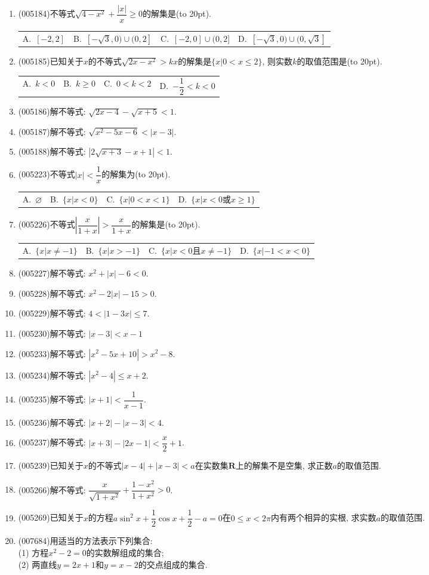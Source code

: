 \documentclass[10pt,a4paper]{article}
\newcommand{\bracket}[1]{(\hbox to #1pt{})}
\newcommand{\fourch}[4]{\par\begin{tabular}{p{.23\textwidth}p{.23\textwidth}p{.23\textwidth}p{.23\textwidth}}
A.~#1 &B.~#2& C.~#3& D.~#4
\end{tabular}}
\begin{document}
\begin{enumerate}[1.]
\item {\tiny (005184)}不等式$\sqrt{4-x^2}+\dfrac{|x|}x\ge 0$的解集是\bracket{20}.
\fourch{$[-2,2]$}{$[-\sqrt 3,0)\cup (0,2]$}{$[-2,0]\cup (0,2]$}{$[-\sqrt 3,0)\cup (0,\sqrt 3]$}
\item {\tiny (005185)}已知关于$x$的不等式$\sqrt{2x-x^2}>kx$的解集是$\{x|0<x\le 2\}$, 则实数$k$的取值范围是\bracket{20}.
\fourch{$k<0$}{$k\ge 0$}{$0<k<2$}{$-\dfrac 12<k<0$}
\item {\tiny (005186)}解不等式: $\sqrt{2x-4}-\sqrt{x+5}<1$.
\item {\tiny (005187)}解不等式: $\sqrt{x^2-5x-6}<|x-3|$.
\item {\tiny (005188)}解不等式: $|2\sqrt{x+3}-x+1|<1$.
\item {\tiny (005223)}不等式$|x|<\dfrac 1x$的解集为\bracket{20}.
\fourch{$\varnothing$}{$\{x|x<0\}$}{$\{x|0<x<1\}$}{$\{x|x<0\text{或}x\ge 1\}$}
\item {\tiny (005226)}不等式$|\dfrac x{1+x}|>\dfrac x{1+x}$的解集是\bracket{20}.
\fourch{$\{x|x\ne -1\}$}{$\{x|x>-1\}$}{$\{x|x<0\text{且}x\ne -1\}$}{$\{x|-1<x<0\}$}
\item {\tiny (005227)}解不等式: $x^2+|x|-6<0$.
\item {\tiny (005228)}解不等式: $x^2-2|x|-15>0$.
\item {\tiny (005229)}解不等式: $4<|1-3x|\le 7$.
\item {\tiny (005230)}解不等式: $|x-3|<x-1$
\item {\tiny (005233)}解不等式: $|x^2-5x+10|>x^2-8$.
\item {\tiny (005234)}解不等式: $|x^2-4|\le x+2$.
\item {\tiny (005235)}解不等式: $|x+1|<\dfrac 1{x-1}$.
\item {\tiny (005236)}解不等式: $|x+2|-|x-3|<4$.
\item {\tiny (005237)}解不等式: $|x+3|-|2x-1|<\dfrac x2+1$.
\item {\tiny (005239)}已知关于$x$的不等式$|x-4|+|x-3|<a$在实数集$\mathbf{R}$上的解集不是空集, 求正数$a$的取值范围.
\item {\tiny (005266)}解不等式: $\dfrac x{\sqrt{1+x^2}}+\dfrac{1-x^2}{1+x^2}>0$.
\item {\tiny (005269)}已知关于$x$的方程$a\sin^2x+\dfrac 12\cos x+\dfrac 12-a=0$在$0\le x<2\pi$内有两个相异的实根, 求实数$a$的取值范围.
\item {\tiny (007684)}用适当的方法表示下列集合:\\
(1) 方程$x^2-2=0$的实数解组成的集合;\\
(2) 两直线$y=2x+1$和$y=x-2$的交点组成的集合.

\end{enumerate}
\end{document}

